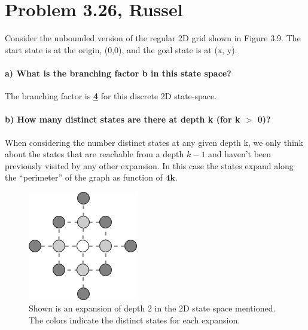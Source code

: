 \documentclass[12pt]{article}
\begin{document}
\maketitle

\section{Problem 3.26, Russel}
Consider the unbounded version of the regular 2D grid shown in Figure 3.9. The start
state is at the origin, (0,0), and the goal state is at (x, y).
\paragraph{a) What is the branching factor b in this state space?}
The branching factor is \underline{\textbf{4}} for this discrete 2D state-space.
\paragraph{b) How many distinct states are there at depth k (for k $>$ 0)?}
When considering the number distinct states at any given depth k, we only think about the states that are reachable from a depth $k-1$ and haven't been previously visited by any other expansion. In this case the states expand along the ``perimeter'' of the graph as function of $\underline{\textbf{4k}}$.
\begin{figure}[ht]
\begin{center}
\includegraphics[scale=.65]{part_a}
\caption{Shown is an expansion of depth 2 in the 2D state space mentioned. The colors indicate the distinct states for each expansion.}
\end{center}
\end{figure}
\end{document}
